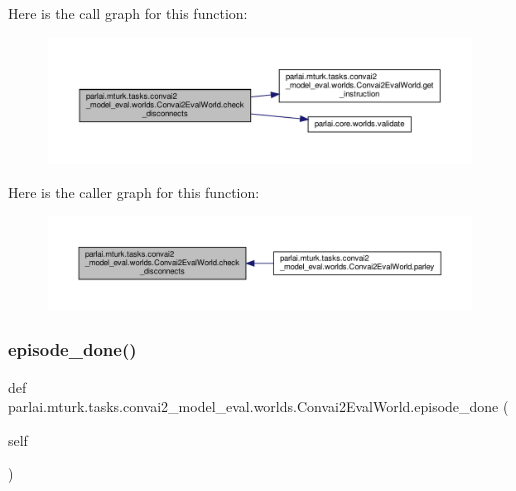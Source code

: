 Here is the call graph for this function\+:
\nopagebreak
\begin{figure}[H]
\begin{center}
\leavevmode
\includegraphics[width=350pt]{classparlai_1_1mturk_1_1tasks_1_1convai2__model__eval_1_1worlds_1_1Convai2EvalWorld_a53f3038cc93afa14d4b4a9fb72d6ca73_cgraph}
\end{center}
\end{figure}
Here is the caller graph for this function\+:
\nopagebreak
\begin{figure}[H]
\begin{center}
\leavevmode
\includegraphics[width=350pt]{classparlai_1_1mturk_1_1tasks_1_1convai2__model__eval_1_1worlds_1_1Convai2EvalWorld_a53f3038cc93afa14d4b4a9fb72d6ca73_icgraph}
\end{center}
\end{figure}
\mbox{\label{classparlai_1_1mturk_1_1tasks_1_1convai2__model__eval_1_1worlds_1_1Convai2EvalWorld_a9ba270c76614ca60f115fe0353cfd056}} 
\subsubsection{\texorpdfstring{episode\+\_\+done()}{episode\_done()}}
{\footnotesize\ttfamily def parlai.\+mturk.\+tasks.\+convai2\+\_\+model\+\_\+eval.\+worlds.\+Convai2\+Eval\+World.\+episode\+\_\+done (\begin{DoxyParamCaption}\item[{}]{self }\end{DoxyParamCaption})}



